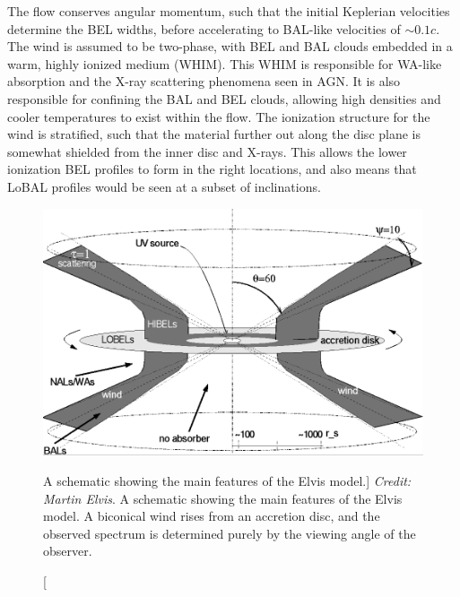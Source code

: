 The flow conserves angular momentum, such that the initial Keplerian velocities
determine the BEL widths, before accelerating to BAL-like velocities of $\sim0.1c$.
The wind is assumed to be two-phase, with BEL and BAL clouds embedded in 
a warm, highly ionized medium (WHIM). This WHIM is responsible for WA-like absorption
and the X-ray scattering phenomena seen in AGN. It is also responsible for confining
the BAL and BEL clouds, allowing high densities and cooler temperatures to exist
within the flow. The ionization structure for the wind is stratified, such that the material
further out along the disc plane is somewhat shielded from the inner disc and X-rays.
This allows the lower ionization BEL profiles to form in the right locations,
and also means that LoBAL profiles would be seen at a subset of inclinations.

\begin{figure}
\centering
\includegraphics[width=1.0\textwidth]{figures/02-outflows/elvis.png}
\caption
[A schematic showing the main features of the Elvis model.]
{
{\sl Credit: Martin Elvis}. 
A schematic showing the main features of the Elvis model. A biconical
wind rises from an accretion disc, and the observed spectrum is determined 
purely by the viewing angle of the observer.
} 
\label{fig:elvis}
\end{figure}

